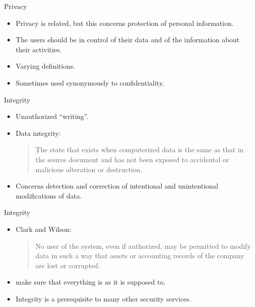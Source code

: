 \documentclass{beamer}
\begin{document}
\begin{frame}{Privacy}
  \begin{itemize}
    \item Privacy is related, but this concerns protection of personal 
      information.

    \item The users should be in control of their data and of the information 
      about their activities.

    \item Varying definitions.
      
    \item Sometimes used synonymously to confidentiality.
  \end{itemize}
\end{frame}

\begin{frame}{Integrity}
  \begin{itemize}
    \item Unauthorized \enquote{writing}.

    \item Data integrity: \blockquote{The state that exists when computerized 
        data is the same as that in the source document and has not been exposed 
        to accidental or malicious alteration or destruction.}

    \item Concerns detection and correction of intentional and unintentional 
      modifications of data.
  \end{itemize}
\end{frame}

\begin{frame}{Integrity}
  \begin{itemize}
    \item Clark and Wilson:
      \blockquote{No user of the system, even if authorized, may be permitted to 
        modify data in such a way that assets or accounting records of the 
        company are lost or corrupted.}

    \item \Ie make sure that everything is as it is supposed to.

    \item Integrity is a prerequisite to many other security services.
  \end{itemize}
\end{frame}
\end{document}
